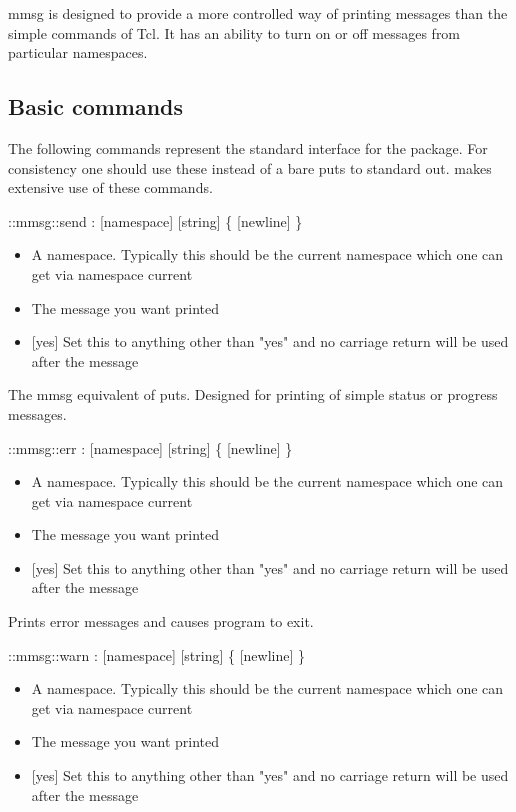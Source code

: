 mmsg is designed to provide a more controlled way of printing messages
than the simple  commands of Tcl. It has an ability to
turn on or off messages from particular namespaces.

\subsection{Basic commands}

The following commands represent the standard interface for the
 package. For consistency one should use these instead
of a bare puts to standard out.  makes extensive use
of these commands.

\begin{code}     
  ::mmsg::send : [namespace] [string] \{ [newline] \}
\end{code}
\begin{itemize}
\item {} A namespace. Typically this should be the
  current namespace which one can get via namespace current
\item {} The message you want printed
\item {} [yes] Set this to anything other than "yes" and no
  carriage return will be used after the message
\end{itemize}
The mmsg equivalent of puts. Designed for printing of simple status or
progress messages.
\begin{code} 
  ::mmsg::err : [namespace] [string] \{ [newline] \}
\end{code}
\begin{itemize}
\item {} A namespace. Typically this should be the
  current namespace which one can get via namespace current
\item {} The message you want printed
\item {} [yes] Set this to anything other than "yes" and no
  carriage return will be used after the message
\end{itemize}
Prints error messages and causes program to exit.
\begin{code} 
  ::mmsg::warn : [namespace] [string] \{ [newline] \}
\end{code}
\begin{itemize}
\item {} A namespace. Typically this should be the
  current namespace which one can get via namespace current
\item {} The message you want printed
\item {} [yes] Set this to anything other than "yes" and no
  carriage return will be used after the message
\end{itemize}

